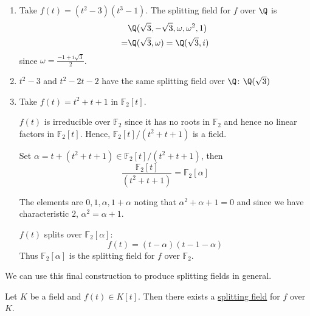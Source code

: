 \documentclass{article}
\begin{document}
\begin{eg}
\begin{enumerate}
        \item Take $f(t) = (t^2 - 3)(t^3 - 1)$. The splitting field for $f$ over $\Q$ is
            \begin{align*}
                &\Q(\sqrt{3}, -\sqrt{3}, \omega, \omega^2, 1) \\
                = &\Q(\sqrt{3}, \omega) = \Q(\sqrt{3}, i)
            \end{align*}
            since $\omega = \frac{-1 + i \sqrt{3}}{2}$.
        \item $t^2 - 3$ and $t^2 - 2t - 2$ have the same splitting field over $\Q$: $\Q(\sqrt{3})$
        \item Take $f(t) = t^2 + t + 1$ in $\mathbb{F}_2[t]$.

            $f(t)$ is irreducible over $\mathbb{F}_2$ since it has no roots in $\mathbb{F}_2$ and hence no linear factors in $\mathbb{F}_2[t]$.
            Hence, $\mathbb{F}_2[t]/(t^2 + t + 1)$ is a field.

            Set $\alpha = t + (t^2 + t + 1) \in \mathbb{F}_2[t]/(t^2 + t + 1)$, then
            \begin{equation*}
                \frac{\mathbb{F}_2[t]}{(t^2 + t + 1)} = \mathbb{F}_2[\alpha]
            \end{equation*}

            The elements are $0, 1, \alpha, 1+\alpha$ noting that $\alpha^2 + \alpha + 1 = 0$ and since we have characteristic $2$, $\alpha^2 = \alpha + 1$.

            $f(t)$ splits over $\mathbb{F}_2[\alpha]$:
            \begin{equation*}
                f(t) = (t-\alpha)(t-1-\alpha)
            \end{equation*}
            Thus $\mathbb{F}_2[\alpha]$ is the splitting field for $f$ over $\mathbb{F}_2$.
    \end{enumerate}
\end{eg}
We can use this final construction to produce splitting fields in general.

\begin{nthm}\label{thm:splittingFieldExistence}
    Let $K$ be a field and $f(t) \in K[t]$. Then there exists a \hyperlink{def:splitting}{splitting field} for $f$ over $K$.
\end{nthm}
\end{document}
